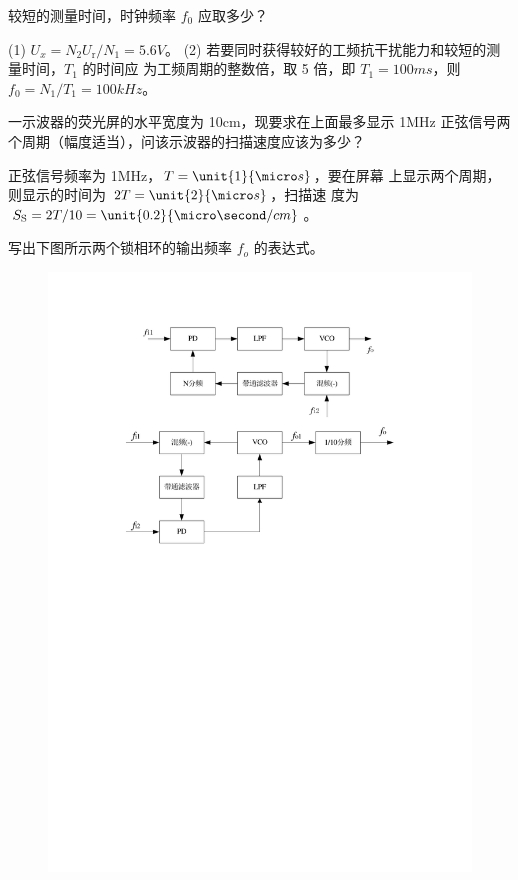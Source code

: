 \documentclass[a4paper,12pt]{examdesign}
\begin{document}
\begin{shortanswer}[title={二、计算题 (每题 10 分，共 80 分)}]
\begin{question}
    较短的测量时间，时钟频率 $f_0$ 应取多少？
    \examvspace*{4cm}
    \begin{answer}
        (1) $U_x = N_2 U_\mathrm{r} / N_1 = \unit{5.6}{V}$。
   (2) 若要同时获得较好的工频抗干扰能力和较短的测量时间，$T_1$ 的时间应
   为工频周期的整数倍，取 5 倍，即 $T_1 = \unit{100}{ms}$，则 $f_0 = N_1
   / T_1 = \unit{100}{kHz}$。
    \end{answer}
\end{question}
\begin{question}
    一示波器的荧光屏的水平宽度为 \unit{10}{cm}，现要求在上面最多显示
    \unit{1}{MHz} 正弦信号两个周期（幅度适当），问该示波器的扫描速度应该为多少？
    \examvspace*{4cm}
    \begin{answer}
        正弦信号频率为 \unit{1}{MHz}，$T=\unit{1}{\micro s}$，要在屏幕
        上显示两个周期，则显示的时间为 $2T = \unit{2}{\micro s}$，扫描速
        度为 $S_\mathrm{S} = 2T / 10 = \unit{0.2}{\micro\second/cm}$。
    \end{answer}
\end{question}
\begin{question}
写出下图所示两个锁相环的输出频率 $f_o$ 的表达式。
    \begin{figure}[H]
        \centering
        \includegraphics{pll}

\end{figure}
\end{question}
\end{shortanswer}
\end{document}
